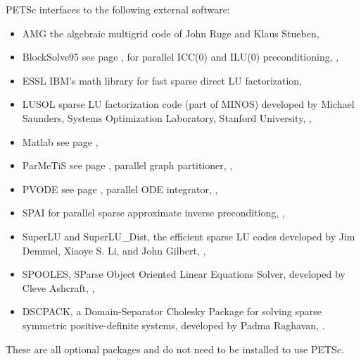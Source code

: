 \vspace{.3in}
\noindent
PETSc interfaces to the following external software:
\begin{itemize}
  \item AMG          the algebraic multigrid code of John Ruge and Klaus Stueben,
  \item BlockSolve95 see page \pageref{sec_blocksolve}, for parallel ICC(0) and ILU(0) preconditioning,
                     ,
  \item ESSL         IBM's math library for fast sparse direct LU factorization,
  \item LUSOL        sparse LU factorization code (part of MINOS) developed by Michael Saunders,
                      Systems Optimization Laboratory, Stanford University,
                     ,
  \item Matlab       see page \pageref{ch_matlab},
  \item ParMeTiS      see page \pageref{sec_partitioning}, parallel graph partitioner,
                     ,
  \item PVODE        see page \pageref{sec_pvode}, parallel ODE integrator,
                     ,
  \item SPAI         for parallel sparse approximate inverse preconditiong, 
                     ,
  \item SuperLU and SuperLU\_Dist, the efficient sparse LU codes developed by Jim Demmel,  Xiaoye S. Li, and John Gilbert, 
                    ,
  \item SPOOLES, SParse Object Oriented Linear Equations Solver, developed by Cleve Ashcraft, 
                    ,
    \item DSCPACK, a Domain-Separator Cholesky Package for solving sparse symmetric positive-definite systems, 
                    developed by Padma Raghavan,   .

\end{itemize}
These are all optional packages and do not need to be installed to use PETSc.


